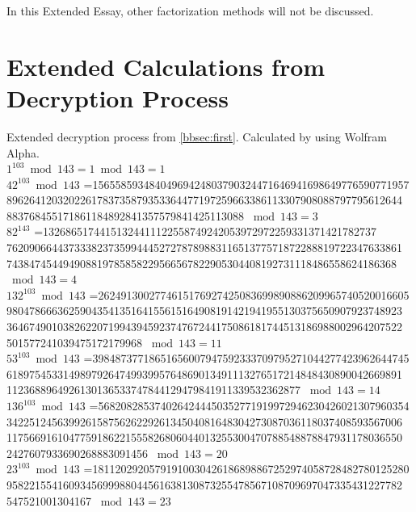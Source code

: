\documentclass[a4paper, 12pt]{article}
\begin{document}
In this Extended Essay, other factorization methods will not be discussed.

\newpage
\singlespace
\appendix
\section{Extended Calculations from Decryption Process}
\label{calc}
Extended decryption process from \ref{bbsec:first}. Calculated by using Wolfram Alpha.\cite{wa}\\

$1^{103} \bmod 143 =1 \bmod 143 = 1$\\

  $42 ^{103} \bmod 143$ =15655859348404969424803790324471646941698649776590771957
8962641203202261783735879353364477197259663386113307908088797795612644
883768455171861184892841357579841425113088 $\bmod 143 = 3$\\

$82 ^ {143}$ =13268651744151324411122558749242053972972259331371421782737
7620906644373338237359944452727878988311651377571872288819722347633861
743847454494908819785858229566567822905304408192731118486558624186368
$\bmod 143 = 4$\\

$132^ {103} \bmod 143$ =2624913002774615176927425083699890886209965740520016605
9804786663625904354135164155615164908191421941955130375650907923748923
3646749010382622071994394592374767244175086181744513186988002964207522
501577241039475172179968 $\bmod 143 = 11$\\

$53^ {103} \bmod 143$ =39848737718651656007947592333709795271044277423962644745
6189754533149897926474993995764869013491113276517214848430890042669891
1123688964926130136533747844129479841911339532362877 $\bmod 143 = 14$\\

$136 ^{103} \bmod 143$ =5682082853740264244450352771919972946230426021307960354
3422512456399261587562622926134504081648304273087036118037408593567006
1175669161047759186221555826806044013255300470788548878847931178036550
2427607933690268883091456 $\bmod 143 = 20$\\

$23 ^{103} \bmod 143$ =18112029205791910030426186898867252974058728482780125280
9582215541609345699988044561638130873255478567108709697047335431227782
547521001304167 $\bmod 143 = 23$\\


\newpage
\end{document}
